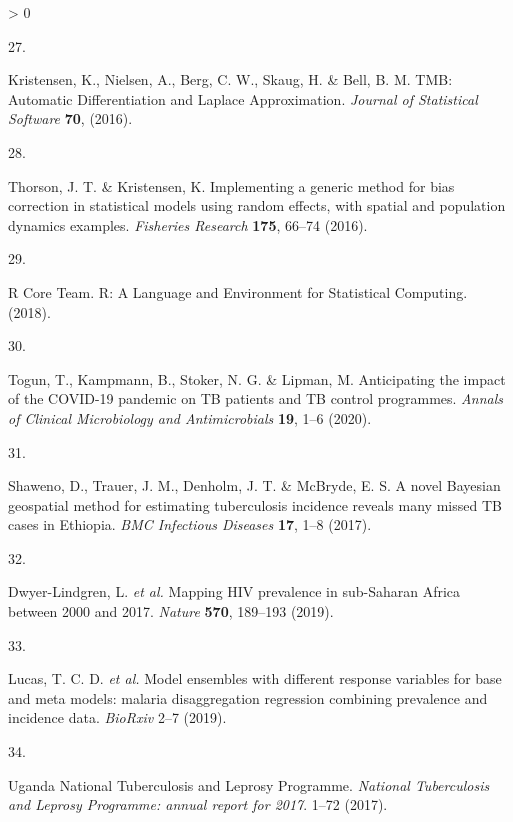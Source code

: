 \documentclass[
]{article}
\newlength{\cslhangindent}
\newlength{\csllabelwidth}
\newenvironment{CSLReferences}[2] %
 {%
  \setlength{\parindent}{0pt}
  \ifodd #1 \everypar{\setlength{\hangindent}{\cslhangindent}}\ignorespaces\fi
  \ifnum #2 > 0
  \setlength{\parskip}{#2\baselineskip}
  \fi
 }%
 {}
\newcommand{\CSLLeftMargin}[1]{\parbox[t]{\csllabelwidth}{#1}}
\newcommand{\CSLRightInline}[1]{\parbox[t]{\linewidth - \csllabelwidth}{#1}\break}
\begin{document}
\begin{CSLReferences}{0}{0}
\leavevmode\hypertarget{ref-Kristensen2016}{}%
\CSLLeftMargin{27. }
\CSLRightInline{Kristensen, K., Nielsen, A., Berg, C. W., Skaug, H. \& Bell, B. M. {TMB: Automatic Differentiation and Laplace Approximation}. \emph{Journal of Statistical Software} \textbf{70}, (2016).}

\leavevmode\hypertarget{ref-Thorson2016}{}%
\CSLLeftMargin{28. }
\CSLRightInline{Thorson, J. T. \& Kristensen, K. {Implementing a generic method for bias correction in statistical models using random effects, with spatial and population dynamics examples}. \emph{Fisheries Research} \textbf{175}, 66--74 (2016).}

\leavevmode\hypertarget{ref-RCoreTeam2018}{}%
\CSLLeftMargin{29. }
\CSLRightInline{R Core Team. {R: A Language and Environment for Statistical Computing}. (2018).}

\leavevmode\hypertarget{ref-Togun2020}{}%
\CSLLeftMargin{30. }
\CSLRightInline{Togun, T., Kampmann, B., Stoker, N. G. \& Lipman, M. {Anticipating the impact of the COVID-19 pandemic on TB patients and TB control programmes}. \emph{Annals of Clinical Microbiology and Antimicrobials} \textbf{19}, 1--6 (2020).}

\leavevmode\hypertarget{ref-Shaweno2017}{}%
\CSLLeftMargin{31. }
\CSLRightInline{Shaweno, D., Trauer, J. M., Denholm, J. T. \& McBryde, E. S. {A novel Bayesian geospatial method for estimating tuberculosis incidence reveals many missed TB cases in Ethiopia}. \emph{BMC Infectious Diseases} \textbf{17}, 1--8 (2017).}

\leavevmode\hypertarget{ref-Dwyer-Lindgren2019}{}%
\CSLLeftMargin{32. }
\CSLRightInline{Dwyer-Lindgren, L. \emph{et al.} {Mapping HIV prevalence in sub-Saharan Africa between 2000 and 2017}. \emph{Nature} \textbf{570}, 189--193 (2019).}

\leavevmode\hypertarget{ref-Lucas2019}{}%
\CSLLeftMargin{33. }
\CSLRightInline{Lucas, T. C. D. \emph{et al.} {Model ensembles with different response variables for base and meta models: malaria disaggregation regression combining prevalence and incidence data}. \emph{BioRxiv} 2--7 (2019).}

\leavevmode\hypertarget{ref-UgandaNationalTuberculosisandLeprosyProgramme2017b}{}%
\CSLLeftMargin{34. }
\CSLRightInline{Uganda National Tuberculosis and Leprosy Programme. \emph{{National Tuberculosis and Leprosy Programme: annual report for 2017}}. 1--72 (2017).}

\end{CSLReferences}

\newpage
\end{document}
